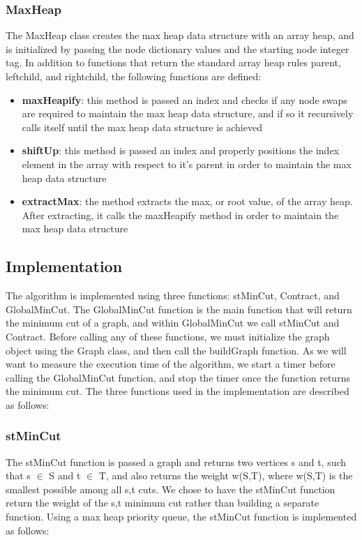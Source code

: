 	\subsubsection{MaxHeap} The MaxHeap class creates the max heap data structure with an array heap, and is initialized by passing the node dictionary values and the starting node integer tag. In addition to functions that return the standard array heap rules parent, leftchild, and rightchild, the following functions are defined:
	\begin{itemize}
	\item \textbf{maxHeapify}: this method is passed an index and checks if any node swaps are required to maintain the max heap data structure, and if so it recursively calls itself until the max heap data structure is achieved 
	\item \textbf{shiftUp}: this method is passed an index and properly positions the index element in the array with respect to it's parent in order to maintain the max heap data structure
	\item \textbf{extractMax}: the method extracts the max, or root value, of the array heap. After extracting, it calls the maxHeapify method in order to maintain the max heap data structure
	\end{itemize}

	

\subsection{Implementation}
The algorithm is implemented using three functions: stMinCut, Contract, and GlobalMinCut. The GlobalMinCut function is the main function that will return the minimum cut of a graph, and within GlobalMinCut we call stMinCut and Contract. Before calling any of these functions, we must initialize the graph object using the Graph class, and then call the buildGraph function. As we will want to measure the execution time of the algorithm, we start a timer before calling the GlobalMinCut function, and stop the timer once the function returns the minimum cut. The three functions used in the implementation are described as follows:

\subsubsection{stMinCut}
The stMinCut function is passed a graph and returns two vertices s and t, such that s $\in$ S and t $\in$ T, and also returns the weight w(S,T), where w(S,T) is the smallest possible among all s,t cuts. We chose to have the stMinCut function return the weight of the s,t minimum cut rather than building a separate function. Using a max heap priority queue, the stMinCut function is implemented as follows:

